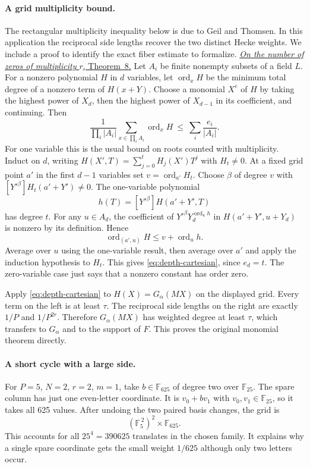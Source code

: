 \documentclass[11pt,letterpaper]{article}
\begin{document}
\paragraph{A grid multiplicity bound.} The rectangular multiplicity inequality below is due to Geil and Thomsen. In this application the reciprocal side lengths recover the two distinct Hecke weights. We include a proof to identify the exact fiber estimate to formalize. \href{https://arxiv.org/pdf/0912.1436}{\textit{On the number of zeros of multiplicity $r$}, Theorem~8.}
Let $A_i$ be finite nonempty subsets of a field $L$. For a nonzero polynomial $H$ in $d$ variables, let $\operatorname{ord}_x H$ be the minimum total degree of a nonzero term of $H(x+Y)$. Choose a monomial $X^e$ of $H$ by taking the highest power of $X_d$, then the highest power of $X_{d-1}$ in its coefficient, and continuing. Then
\begin{equation}
 \frac{1}{\prod_i |A_i|}\sum_{x\in\prod_i A_i}\operatorname{ord}_x H
       \ \leq\ \sum_i\frac{e_i}{|A_i|}.
 \label{eq:depth-cartesian}
\end{equation}
For one variable this is the usual bound on roots counted with multiplicity. Induct on $d$, writing $H(X',T)=\sum_{j=0}^t H_j(X')T^j$ with $H_t\ne0$. At a fixed grid point $a'$ in the first $d-1$ variables set $v=\operatorname{ord}_{a'} H_t$. Choose $\beta$ of degree $v$ with $[Y'^\beta]H_t(a'+Y')\ne0$. The one-variable polynomial
\[
 h(T)=[Y'^\beta]H(a'+Y',T)
\]
has degree $t$. For any $u\in A_d$, the coefficient of $Y'^\beta Y_d^{\operatorname{ord}_u h}$ in $H(a'+Y',u+Y_d)$ is nonzero by its definition. Hence
\[
 \operatorname{ord}_{(a',u)}H\leq v+\operatorname{ord}_u h.
\]
Average over $u$ using the one-variable result, then average over $a'$ and apply the induction hypothesis to $H_t$. This gives \eqref{eq:depth-cartesian}, since $e_d=t$. The zero-variable case just says that a nonzero constant has order zero.

Apply \eqref{eq:depth-cartesian} to $H(X)=G_\alpha(MX)$ on the displayed grid. Every term on the left is at least $\tau$. The reciprocal side lengths on the right are exactly $1/P$ and $1/P^{2r}$. Therefore $G_\alpha(MX)$ has weighted degree at least $\tau$, which transfers to $G_\alpha$ and to the support of $F$. This proves the original monomial theorem directly. 
\paragraph{A short cycle with a large side.}
For $P=5$, $N=2$, $r=2$, $m=1$, take $b\in\mathbb F_{625}$ of degree two over $\mathbb F_{25}$. The spare column has just one even-letter coordinate. It is $v_0+bv_1$ with $v_0,v_1\in\mathbb F_{25}$, so it takes all 625 values. After undoing the two paired basis changes, the grid is
\[
 (\mathbb F_5^{\,2})^2\times\mathbb F_{625}.
\]
This accounts for all $25^4=390625$ translates in the chosen family. It explains why a single spare coordinate gets the small weight $1/625$ although only two letters occur.
\end{document}
